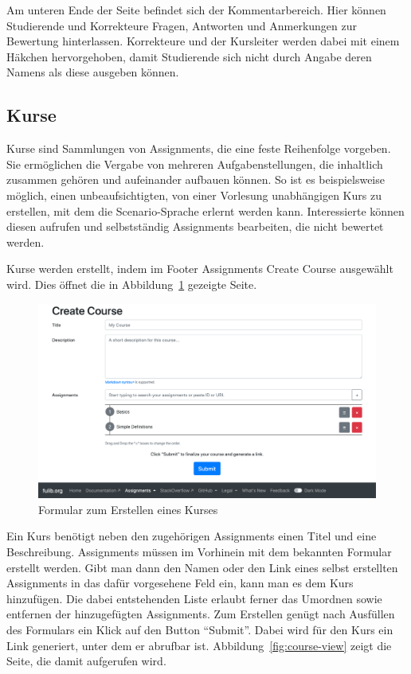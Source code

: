 Am unteren Ende der Seite befindet sich der Kommentarbereich.
Hier können Studierende und Korrekteure Fragen, Antworten und Anmerkungen zur Bewertung hinterlassen.
Korrekteure und der Kursleiter werden dabei mit einem Häkchen hervorgehoben,
damit Studierende sich nicht durch Angabe deren Namens als diese ausgeben können.

\subsection{Kurse}\label{subsec:courses}

Kurse sind Sammlungen von Assignments, die eine feste Reihenfolge vorgeben.
Sie ermöglichen die Vergabe von mehreren Aufgabenstellungen, die inhaltlich zusammen gehören und aufeinander aufbauen können.
So ist es beispielsweise möglich, einen unbeaufsichtigten, von einer Vorlesung unabhängigen Kurs zu erstellen, mit dem die Scenario-Sprache erlernt werden kann.
Interessierte können diesen aufrufen und selbstständig Assignments bearbeiten, die nicht bewertet werden.

Kurse werden erstellt, indem im Footer Assignments \textrightarrow Create Course ausgewählt wird.
Dies öffnet die in Abbildung~\ref{fig:create-course} gezeigte Seite.

\begin{figure}
    \centering
    \includegraphics[width=\textwidth]{chapter/fulib.org/img/create-course.png}
    \caption{Formular zum Erstellen eines Kurses}
    \label{fig:create-course}
\end{figure}

Ein Kurs benötigt neben den zugehörigen Assignments einen Titel und eine Beschreibung.
Assignments müssen im Vorhinein mit dem bekannten Formular erstellt werden.
Gibt man dann den Namen oder den Link eines selbst erstellten Assignments in das dafür vorgesehene Feld ein, kann man es dem Kurs hinzufügen.
Die dabei entstehenden Liste erlaubt ferner das Umordnen sowie entfernen der hinzugefügten Assignments.
Zum Erstellen genügt nach Ausfüllen des Formulars ein Klick auf den Button ``Submit''.
Dabei wird für den Kurs ein Link generiert, unter dem er abrufbar ist.
Abbildung~\ref{fig:course-view} zeigt die Seite, die damit aufgerufen wird.

